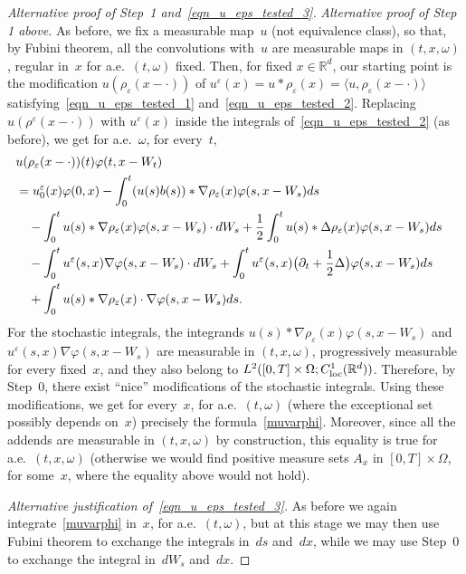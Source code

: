 \documentclass[a4paper,10pt]{article}
\newcommand\1{\mathbbm{1}}
\newcommand{\mr}{\mathbb{R}}
\newcommand{\lan}{\langle}
\newcommand{\ran}{\rangle}
\newcommand{\eps}{\varepsilon}
\newcommand\loc{{\rm loc}}
\numberwithin{equation}{section}
\begin{document}
\begin{proof}[Alternative proof of Step~1 and~\eqref{eqn_u_eps_tested_3}]
\emph{Alternative proof of Step 1 above.} As before, we fix a measurable map~$u$ (not equivalence class), so that, by Fubini theorem, all the convolutions with~$u$ are measurable maps in $(t,x,\omega)$, regular in~$x$ for a.e.~$(t,\omega)$ fixed. Then, for fixed $x \in \mr^d$, our starting point is the modification $u(\rho_\eps(x-\cdot))$ of $u^\eps(x) = u*\rho_\eps (x) = \lan u, \rho_\eps(x-\cdot) \ran$ satisfying~\eqref{eqn_u_eps_tested_1} and~\eqref{eqn_u_eps_tested_2}. Replacing $u(\rho^\eps(x-\cdot))$ with $u^\eps(x)$ inside the integrals of~\eqref{eqn_u_eps_tested_2} (as before), we get for a.e.~$\omega$, for every~$t$, 
\begin{align*}
\lefteqn{ u(\rho_\eps(x-\cdot))(t)\varphi(t,x-W_t)} \\
 & = u_0^\eps(x)\varphi(0,x) -\int^t_0(u(s) b(s))*\nabla\rho_\eps(x)\varphi(s,x-W_s) ds \\
 & \quad -\int^t_0 u(s)*\nabla\rho_\eps(x)\varphi(s,x-W_s)\cdot d W_s +\frac12 \int^t_0 u(s)*\Delta\rho_\eps(x)\varphi(s,x-W_s) ds \\
 & \quad -\int^t_0 u^\eps(s,x)\nabla\varphi(s,x-W_s)\cdot d W_s +\int^t_0 u^\eps(s,x) \big(\partial_t+\frac12\Delta\big)\varphi(s,x-W_s) ds \\
 & \quad +\int^t_0 u(s)*\nabla\rho_\eps(x)\cdot\nabla\varphi(s,x-W_s) ds.\end{align*}
For the stochastic integrals, the integrands $u(s)*\nabla\rho_\eps(x)\varphi(s,x-W_s)$ and $u^\eps(s,x)\nabla\varphi(s,x-W_s)$ are measurable in $(t,x,\omega)$, progressively measurable for every fixed~$x$, and they also belong to $L^2([0,T]\times\Omega;C^1_{\loc}(\mr^d))$. Therefore, by Step~0, there exist ``nice'' modifications of the stochastic integrals. Using these modifications, we get for every~$x$, for a.e.~$(t,\omega)$ (where the exceptional set possibly depends on~$x$) precisely the formula~\eqref{muvarphi}. Moreover, since all the addends are measurable in $(t,x,\omega)$ by construction, this equality is true for a.e.~$(t,x,\omega)$ (otherwise we would find positive measure sets $A_x$ in $[0,T]\times\Omega$, for some~$x$, where the equality above would not hold).

\emph{Alternative justification of~\eqref{eqn_u_eps_tested_3}.} As before we again integrate~\eqref{muvarphi} in~$x$, for a.e.~$(t,\omega)$, but at this stage we may then use Fubini theorem to exchange the integrals in~$ds$ and~$dx$, while we may use Step~0 to exchange the integral in~$dW_s$ and~$dx$.
\end{proof}
\end{document}
